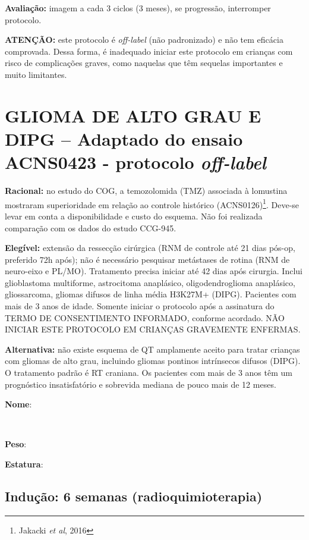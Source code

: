 \documentclass[11pt,a4paper,oldfontcommands]{memoir}
\def\entrywithlabel[#1]#2{\parbox{#1}{{\small #2:} \hrulefill}}
\begin{document}
\textbf{Avaliação:} imagem a cada 3 ciclos (3 meses), se progressão, interromper protocolo.

\textbf{ATENÇÃO:} este protocolo é \textit{off-label} (não padronizado) e não tem eficácia comprovada. Dessa forma, é inadequado iniciar este protocolo em crianças com risco de complicações graves, como naquelas que têm sequelas importantes e muito limitantes.

\cleardoublepage

\section{GLIOMA DE ALTO GRAU E DIPG -- Adaptado do ensaio ACNS0423 - protocolo \textit{off-label}}
{\let\thefootnote\relax{}}
\textbf{Racional:} no estudo do COG, a temozolomida (TMZ) associada à lomustina mostraram superioridade em relação ao controle histórico (ACNS0126)\footnote{Jakacki \textit{et al}, 2016}. Deve-se levar em conta a disponibilidade e custo do esquema. Não foi realizada comparação com os dados do estudo CCG-945.

\textbf{Elegível:} extensão da ressecção cirúrgica (RNM de controle até 21 dias pós-op, preferido 72h após); não é necessário pesquisar metástases de rotina (RNM de neuro-eixo e PL/MO). Tratamento precisa iniciar até 42 dias após cirurgia. Inclui glioblastoma multiforme, astrocitoma anaplásico, oligodendroglioma anaplásico, gliossarcoma, gliomas difusos de linha média H3K27M+ (DIPG). Pacientes com mais de 3 anos de idade. Somente iniciar o protocolo após a assinatura do TERMO DE CONSENTIMENTO INFORMADO, conforme acordado. NÃO INICIAR ESTE PROTOCOLO EM CRIANÇAS GRAVEMENTE ENFERMAS.

\textbf{Alternativa:} não existe esquema de QT amplamente aceito para tratar crianças com gliomas de alto grau, incluindo gliomas pontinos intrínsecos difusos (DIPG). O tratamento padrão é RT craniana. Os pacientes com mais de 3 anos têm um prognóstico insatisfatório e sobrevida mediana de pouco mais de 12 meses.
\\[0.4cm]
\entrywithlabel[1\hsize]{\textbf{Nome}}\hfill
\\[0.3cm]
\entrywithlabel[.45\hsize]{\textbf{Peso}}\hfill  \entrywithlabel[.45\hsize]{\textbf{Estatura}}

\subsection{Indução: 6 semanas (radioquimioterapia)}
\end{document}
